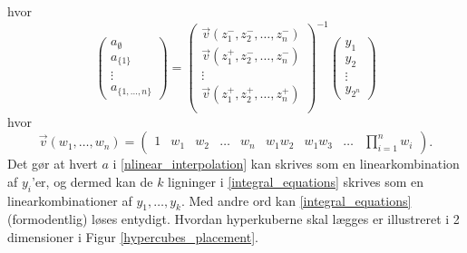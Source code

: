 \documentclass[a4paper, 12pt]{memoir}
\begin{document}
hvor 
\begin{equation}
\begin{pmatrix}
a_{\emptyset}\\
a_{\{1\}}\\
\vdots\\
a_{\{1, \dots, n\}}
\end{pmatrix}=\begin{pmatrix}
\vec{v}(z_1^{-},z_2^-, \dots, z_n^-)\\
\vec{v}(z_1^{+},z_2^-, \dots, z_n^-)\\
\vdots\\
\vec{v}(z_1^{+},z_2^+, \dots, z_n^+)\\
\end{pmatrix}^{-1}
\begin{pmatrix}
y_1\\
y_2\\
\vdots\\
y_{2^n}
\end{pmatrix}
\end{equation}
hvor
\begin{equation*}
\vec{v}(w_1, \dots, w_n)=\begin{pmatrix}
1 & w_1 & w_2 & \dots & w_n & w_1w_2 & w_1w_3 & \dots & \prod_{i=1}^nw_i
\end{pmatrix}.
\end{equation*}
Det gør at hvert $a$ i \eqref{nlinear_interpolation} kan skrives som en linearkombination af $y_i$'er, og dermed kan de $k$ ligninger i \eqref{integral_equations} skrives som en linearkombinationer af $y_1, \dots, y_k$. Med andre ord kan \eqref{integral_equations} (formodentlig) løses entydigt. Hvordan hyperkuberne skal lægges er illustreret i 2 dimensioner i Figur \ref{hypercubes_placement}. 
\end{document}
